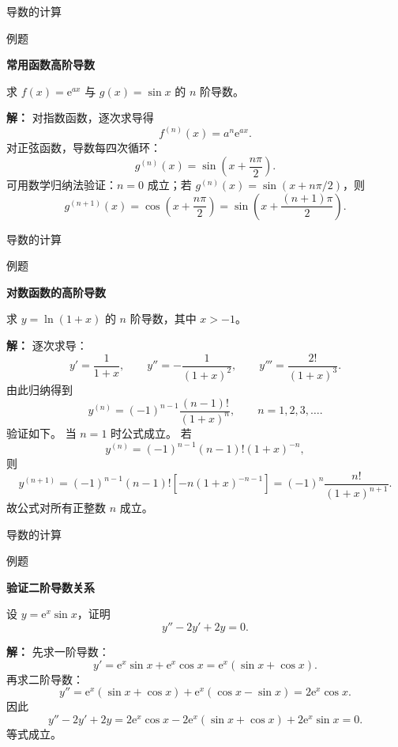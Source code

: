 \documentclass[aspectratio=169,10pt,fontset=fandol]{ctexbeamer}
\newcommand{\ee}{\mathrm{e}}
\begin{document}
\begin{frame}[t,fragile]{导数的计算}
\normalsize
\begin{block}{例题}
{\normalsize
\textbf{常用函数高阶导数}\par

求 $f(x)=\ee^{ax}$ 与 $g(x)=\sin x$ 的 $n$ 阶导数。

}
\end{block}
\pause
{\normalsize
\textbf{解：}
对指数函数，逐次求导得
\[
f^{(n)}(x)=a^n\ee^{ax}.
\]
对正弦函数，导数每四次循环：
\[
g^{(n)}(x)=\sin\left(x+\frac{n\pi}{2}\right).
\]
可用数学归纳法验证：$n=0$ 成立；若 $g^{(n)}(x)=\sin(x+n\pi/2)$，则
\[
g^{(n+1)}(x)=\cos\left(x+\frac{n\pi}{2}\right)=\sin\left(x+\frac{(n+1)\pi}{2}\right).
\]

}
\end{frame}
\begin{frame}[t,fragile]{导数的计算}
\footnotesize
\begin{block}{例题}
{\footnotesize
\textbf{对数函数的高阶导数}\par

求 $y=\ln(1+x)$ 的 $n$ 阶导数，其中 $x>-1$。

}
\end{block}
\pause
{\footnotesize
\textbf{解：}
逐次求导：
\[
y'=\frac1{1+x},\qquad
y''=-\frac1{(1+x)^2},\qquad
y'''=\frac{2!}{(1+x)^3}.
\]
由此归纳得到
\[
y^{(n)}=(-1)^{n-1}\frac{(n-1)!}{(1+x)^n},\qquad n=1,2,3,\ldots.
\]
验证如下。 当 $n=1$ 时公式成立。 若
\[
y^{(n)}=(-1)^{n-1}(n-1)!(1+x)^{-n},
\]
则
\[
y^{(n+1)}
=(-1)^{n-1}(n-1)![-n(1+x)^{-n-1}]
=(-1)^n\frac{n!}{(1+x)^{n+1}}.
\]
故公式对所有正整数 $n$ 成立。

}
\end{frame}
\begin{frame}[t,fragile]{导数的计算}
\small
\begin{block}{例题}
{\small
\textbf{验证二阶导数关系}\par

设 $y=\ee^x\sin x$，证明
\[
y''-2y'+2y=0.
\]

}
\end{block}
\pause
{\small
\textbf{解：}
先求一阶导数：
\[
y'=\ee^x\sin x+\ee^x\cos x=\ee^x(\sin x+\cos x).
\]
再求二阶导数：
\[
y''=\ee^x(\sin x+\cos x)+\ee^x(\cos x-\sin x)=2\ee^x\cos x.
\]
因此
\[
y''-2y'+2y
=2\ee^x\cos x-2\ee^x(\sin x+\cos x)+2\ee^x\sin x=0.
\]
等式成立。

}
\end{frame}
\end{document}
